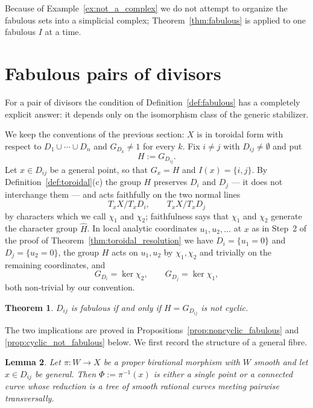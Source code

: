\documentclass[11pt]{amsart}
\theoremstyle{plain}
\newtheorem{theorem}{Theorem}[section]
\newtheorem{lemma}[theorem]{Lemma}
\theoremstyle{definition}
\theoremstyle{remark}
\numberwithin{equation}{section}
\begin{document}
Because of Example~\ref{ex:not_a_complex} we do not attempt to organize the
fabulous sets into a simplicial complex; Theorem~\ref{thm:fabulous} is
applied to one fabulous $I$ at a time.

\section{Fabulous pairs of divisors}

For a pair of divisors the condition of Definition~\ref{def:fabulous} has a
completely explicit answer: it depends only on the isomorphism class of the
generic stabilizer.

We keep the conventions of the previous section: $X$ is in toroidal form
with respect to $D_1 \cup \cdots \cup D_n$ and $G_{D_k} \neq 1$ for every
$k$.  Fix $i \neq j$ with $D_{ij} \neq \emptyset$ and put
\[
H := G_{D_{ij}} .
\]
Let $x \in D_{ij}$ be a general point, so that $G_x = H$ and
$I(x) = \{i,j\}$.  By Definition~\ref{def:toroidal}(c) the group $H$
preserves $D_i$ and $D_j$ --- it does not interchange them --- and acts
faithfully on the two normal lines
\[
T_xX/T_xD_i , \qquad T_xX/T_xD_j
\]
by characters which we call $\chi_1$ and $\chi_2$; faithfulness says that
$\chi_1$ and $\chi_2$ generate the character group $\widehat{H}$.  In local
analytic coordinates $u_1, u_2, \ldots$ at $x$ as in Step~2 of the proof of
Theorem~\ref{thm:toroidal_resolution} we have $D_i = \{u_1 = 0\}$ and
$D_j = \{u_2 = 0\}$, the group $H$ acts on $u_1, u_2$ by $\chi_1, \chi_2$
and trivially on the remaining coordinates, and
\[
G_{D_i} = \ker \chi_2 , \qquad G_{D_j} = \ker \chi_1 ,
\]
both non-trivial by our convention.

\begin{theorem} \label{thm:pairs}
$D_{ij}$ is fabulous if and only if $H = G_{D_{ij}}$ is not cyclic.
\end{theorem}

The two implications are proved in
Propositions~\ref{prop:noncyclic_fabulous} and
\ref{prop:cyclic_not_fabulous} below.  We first record the structure of a
general fibre.

\begin{lemma} \label{lem:tree}
Let $\pi : W \to X$ be a proper birational morphism with $W$ smooth and let
$x \in D_{ij}$ be general.  Then $\Phi := \pi^{-1}(x)$ is either a single
point or a connected curve whose reduction is a tree of smooth rational
curves meeting pairwise transversally.
\end{lemma}
\end{document}
